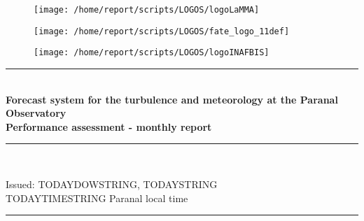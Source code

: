 \documentclass[11pt,english]{article}
\newcommand{\HRule}{\rule{\linewidth}{0.5mm}}
\begin{document}
\begin{figure}
\begin{center}
\hspace{1.5cm}
\parbox{5.5cm}{\texttt{[image: /home/report/scripts/LOGOS/logoLaMMA]}}
\hspace{.3cm}
\parbox{5.5cm}{\texttt{[image: /home/report/scripts/LOGOS/fate\_logo\_11def]}}
\hspace{.3cm}
\parbox{5.5cm}{\texttt{[image: /home/report/scripts/LOGOS/logoINAFBIS]}}
\hspace{.1cm}
\vspace{1.2cm}
\end{center}
\end{figure}

\begin{center}
\HRule \\[0.4cm]
\Huge{\textbf{Forecast system for the turbulence and meteorology at the Paranal Observatory}}
\\[0.4cm]
\LARGE{\textbf{Performance assessment - monthly report}}
\HRule \\[0.4cm]
\end{center}

\begin{center}
\vspace{2cm}\Huge{Issued: TODAYDOWSTRING, TODAYSTRING\\ TODAYTIMESTRING Paranal local time}
\HRule \\[0.1cm]
\end{center}

\clearpage
\end{document}
